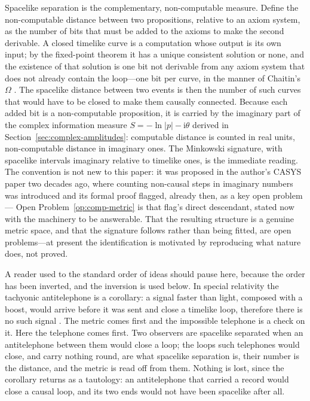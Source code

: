 Spacelike separation is the complementary, non-computable measure. Define the
non-computable distance between two propositions, relative to an axiom system, as
the number of bits that must be added to the axioms to make the second derivable.
A closed timelike curve is a computation whose output is its own input; by the
fixed-point theorem it has a unique consistent solution or none, and the
existence of that solution is one bit not derivable from any axiom system that
does not already contain the loop---one bit per curve, in the manner of Chaitin's
$\Omega$ \autocite{Chaitin1998}. The spacelike distance between two events is then
the number of such curves that would have to be closed to make them causally
connected. Because each added bit is a non-computable proposition, it is carried
by the imaginary part of the complex information measure
$S=-\ln\lvert p\rvert-\mathrm{i}\theta$ derived in
Section~\ref{sec:complex-amplitudes}: computable distance is counted in real
units, non-computable distance in imaginary ones. The Minkowski signature, with
spacelike intervals imaginary relative to timelike ones, is the immediate reading. The convention is not new to this paper: it was proposed in the author's CASYS paper two
decades ago, where counting non-causal steps in imaginary numbers was introduced and its formal
proof flagged, already then, as a key open problem \autocite{small_2006} ---
Open Problem~\ref{op:comp-metric} is that flag's direct descendant, stated now with the machinery
to be answerable.
That the resulting structure is a genuine metric space, and that the signature
follows rather than being fitted, are open problems---at present the
identification is motivated by reproducing what nature does, not proved.

A reader used to the standard order of ideas should pause here, because the order has been
inverted, and the inversion is used below. In special relativity the tachyonic antitelephone is a
corollary: a signal faster than light, composed with a boost, would arrive before it was sent and
close a timelike loop, therefore there is no such signal \autocite{tolman1917theory,
benfordbooknewcomb1970tachyonic}. The metric comes first and the impossible telephone is a check
on it. Here the telephone comes first. Two observers are spacelike separated when an antitelephone
between them would close a loop; the loops such telephones would close, and carry nothing round,
are what spacelike separation is, their number is the distance, and the metric is read off from
them. Nothing is lost, since the corollary returns as a tautology: an antitelephone that carried
a record would close a causal loop, and its two ends would not have been spacelike after all.

